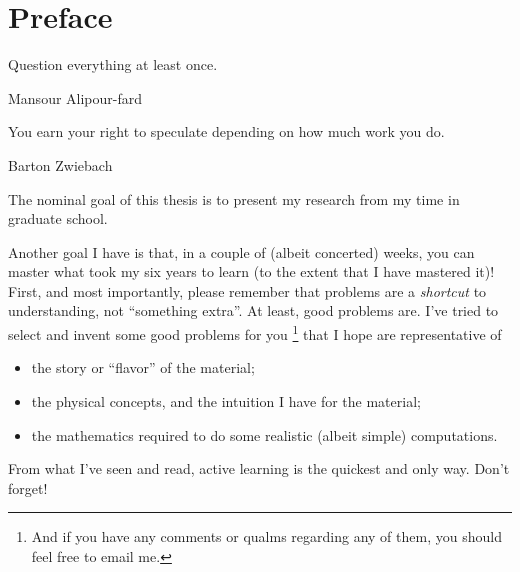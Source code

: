 \section*{Preface}

\epigraph{Question everything at least once.}{Mansour Alipour-fard}

\epigraph{You earn your right to speculate depending on how much work you do.}{Barton Zwiebach}


The nominal goal of this thesis is to present my research from my time in graduate school.

Another goal I have is that, in a couple of (albeit concerted) weeks, you can master what took my six years to learn (to the extent that I have mastered it)!
%
First, and most importantly, please remember that problems are a \textit{shortcut} to understanding, not ``something extra''.
%
At least, good problems are.
%
I've tried to select and invent some good problems for you%
\footnote{
    And if you have any comments or qualms regarding any of them, you should feel free to email me.
}
%
that I hope are representative of
\begin{itemize}
    \item
        the story or ``flavor'' of the material;

    \item
        the physical concepts, and the intuition I have for the material;

    \item
        the mathematics required to do some realistic (albeit simple) computations.
\end{itemize}
%
From what I've seen and read, active learning is the quickest and only way.
%
Don't forget!

